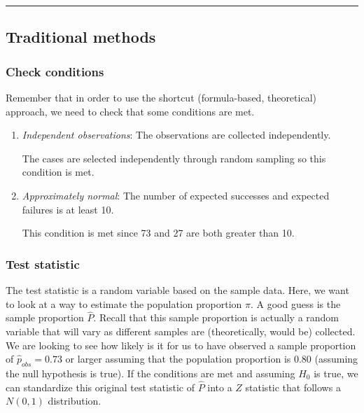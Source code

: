 \documentclass[]{tufte-book}
\let\oldrule=\rule
\renewcommand{\rule}[1]{\oldrule{\linewidth}}
\begin{document}
\begin{center}\rule{0.5\linewidth}{\linethickness}\end{center}

\subsection{Traditional methods}\label{traditional-methods-1}

\subsubsection{Check conditions}\label{check-conditions-1}

Remember that in order to use the shortcut (formula-based, theoretical)
approach, we need to check that some conditions are met.

\begin{enumerate}
\def\labelenumi{\arabic{enumi}.}
\item
  \emph{Independent observations}: The observations are collected
  independently.

  The cases are selected independently through random sampling so this
  condition is met.
\item
  \emph{Approximately normal}: The number of expected successes and
  expected failures is at least 10.

  This condition is met since 73 and 27 are both greater than 10.
\end{enumerate}

\subsubsection{Test statistic}\label{test-statistic-1}

The test statistic is a random variable based on the sample data. Here,
we want to look at a way to estimate the population proportion \(\pi\).
A good guess is the sample proportion \(\hat{P}\). Recall that this
sample proportion is actually a random variable that will vary as
different samples are (theoretically, would be) collected. We are
looking to see how likely is it for us to have observed a sample
proportion of \(\hat{p}_{obs} = 0.73\) or larger assuming that the
population proportion is 0.80 (assuming the null hypothesis is true). If
the conditions are met and assuming \(H_0\) is true, we can standardize
this original test statistic of \(\hat{P}\) into a \(Z\) statistic that
follows a \(N(0, 1)\) distribution.
\end{document}
